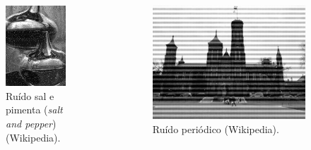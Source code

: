 \begin{frame}[allowframebreaks]
\begin{columns}[c]
\begin{figure}[h!]
    \includegraphics[width=0.8\textwidth]{images/saltandpepper.png}
    \caption{Ruído sal e pimenta (\textit{salt and pepper}) (Wikipedia).}
    \label{fig:saltandpepper}
    \end{figure}
    \begin{figure}[h!]
    \centering
    \includegraphics[width=\textwidth]{images/smithsonian-castle.jpg}
    \caption{Ruído periódico (Wikipedia).}
    \label{fig:smithsonian-castle}
    \end{figure}
  \end{columns}



\end{frame}
